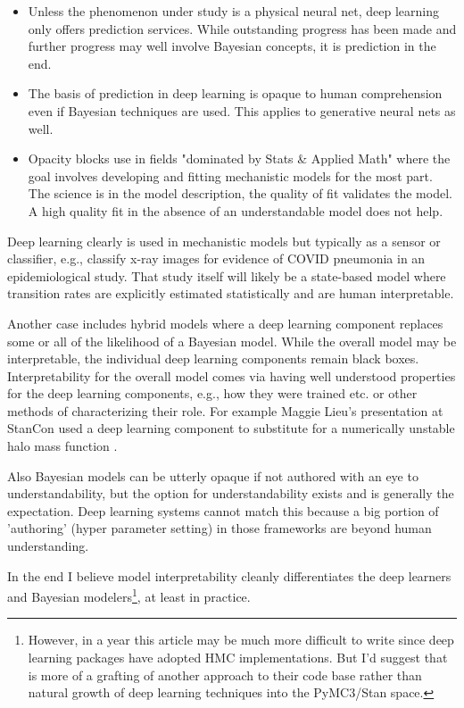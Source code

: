 \documentclass[AMA,STIX1COL]{WileyNJD-v2}
\begin{document}
\begin{itemize}
    \item Unless the phenomenon under study is a physical neural net, deep learning only offers prediction services. While outstanding progress has been made and further progress may well involve Bayesian concepts, it is prediction in the end. 
    \item The basis of prediction in deep learning is opaque to human comprehension even if Bayesian techniques are used. This applies to generative neural nets as well. 
    \item Opacity blocks use in fields "dominated by Stats \& Applied Math" where the goal involves developing and fitting mechanistic models for the most part. The science is in the model description, the quality of fit validates the model. A high quality fit in the absence of an understandable model does not help. 
\end{itemize}

Deep learning clearly is used in mechanistic models but typically as a sensor or classifier, e.g., classify x-ray images for evidence of COVID pneumonia in an epidemiological study. That study itself will likely be a state-based model where transition rates are explicitly estimated statistically and are human interpretable. 

Another case includes hybrid models where a deep learning component replaces some or all of the likelihood of a Bayesian model. While the overall model may be interpretable, the individual deep learning components remain black boxes. Interpretability for the overall model comes via having well understood properties for the deep learning components, e.g., how they were trained etc. or other methods of characterizing their role. For example Maggie Lieu's presentation at StanCon used a deep learning component to substitute for a numerically unstable halo mass function \cite{lieuAstro}.

Also Bayesian models can be utterly opaque if not authored with an eye to understandability, but the option for understandability exists and is generally the expectation. Deep learning systems cannot match this because a big portion of 'authoring' (hyper parameter setting) in those frameworks are beyond human understanding.

In the end I believe model interpretability cleanly differentiates the deep learners and Bayesian modelers\footnote{\label{two}However, in a year this article may be much more difficult to write since deep learning packages have adopted HMC implementations. But I'd suggest that is more of a grafting of another approach to their code base rather than natural growth of deep learning techniques into the PyMC3/Stan space.}, at least in practice. 
\end{document}
